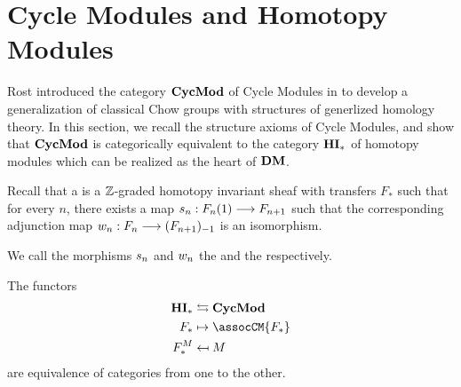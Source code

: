 \newpage
\section{Cycle Modules and Homotopy Modules}\label{sect_cycmod_and_hm}

Rost introduced the category $\mathbf{CycMod}$ of Cycle Modules in 
\cite{Rost96} to develop a generalization of classical Chow groups 
with structures of generlized homology theory. In this section, we 
recall the structure axioms of Cycle Modules, and show that
$\mathbf{CycMod}$ is categorically equivalent to the category $\mathbf{HI}_*$ of 
homotopy modules which can be realized as the heart of $\mathbf{DM}$.



\begin{defn}\label{def_hm}
Recall that a  is a $\mathbb{Z}$-graded homotopy 
invariant sheaf with transfers $F_*$ such that for every $n$, 
there exists a map $s_n: F_n(1) \longrightarrow F_{n+1}$ such that the 
corresponding adjunction map $w_n: F_n \longrightarrow (F_{n+1})_{-1}$
is an isomorphism.

We call the morphisms $s_n$ and $w_n$ the  and the  respectively.
\end{defn}

\begin{thm}\label{thm_corresp_cyc_mod_hom_mod}
The functors
\begin{align*}
\HI_* &\leftrightarrows \CycMod \\
  F_* & \mapsto \assocCM{F_*}   \\
F^M_* & \mapsfrom M
\end{align*}
are equivalence of categories from one to the other.
\end{thm}
